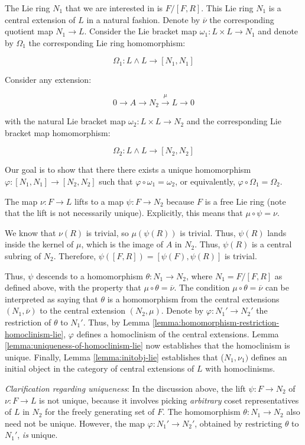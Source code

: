 The Lie ring $N_1$ that we are interested in is $F/[F,R]$. This Lie ring
$N_1$ is a central extension of $L$ in a natural fashion. Denote by
$\overline{\nu}$ the corresponding quotient map $N_1 \to L$. Consider
the Lie bracket map $\omega_1:L \times L \to N_1$ and denote by
$\Omega_1$ the corresponding Lie ring homomorphism:

$$\Omega_1: L \wedge L \to [N_1,N_1]$$

Consider any extension:

$$0 \to A \to N_2 \stackrel{\mu}{\to} L \to 0$$

with the natural Lie bracket map $\omega_2:L \times L \to N_2$ and the
corresponding Lie bracket map homomorphism:

$$\Omega_2:L \wedge L \to [N_2,N_2]$$

Our goal is to show that there there exists a unique homomorphism
$\varphi:[N_1,N_1] \to [N_2,N_2]$ such that $\varphi \circ
\omega_1 = \omega_2$, or equivalently, $\varphi \circ \Omega_1 =
\Omega_2$.

The map $\nu:F \to L$ lifts to a map $\psi:F \to N_2$ because $F$
is a free Lie ring (note that the lift is not necessarily
unique). Explicitly, this means that $\mu \circ \psi = \nu$.

We know that $\nu(R)$ is trivial, so $\mu(\psi(R))$ is trivial. Thus,
$\psi(R)$ lands inside the kernel of $\mu$, which is the image of $A$
in $N_2$. Thus, $\psi(R)$ is a central subring of $N_2$. Therefore,
$\psi([F,R]) = [\psi(F),\psi(R)]$ is trivial.

Thus, $\psi$ descends to a homomorphism $\theta:N_1 \to N_2$, where
$N_1 = F/[F,R]$ as defined above, with the property that $\mu \circ
\theta = \overline{\nu}$. The condition $\mu \circ \theta =
\overline{\nu}$ can be interpreted as saying that $\theta$ is a
homomorphism from the central extensions $(N_1,\overline{\nu})$ to the
central extension $(N_2,\mu)$. Denote by $\varphi:N_1' \to N_2'$ the
restriction of $\theta$ to $N_1'$. Thus, by Lemma
\ref{lemma:homomorphism-restriction-homoclinism-lie}, $\varphi$
defines a homoclinism of the central extensions. Lemma
\ref{lemma:uniqueness-of-homoclinism-lie} now establishes that the
homoclinism is unique. Finally, Lemma \ref{lemma:initobj-lie}
establishes that ($N_1,\nu_1)$ defines an initial object in the
category of central extensions of $L$ with homoclinisms.

{\em Clarification regarding uniqueness}: In the discussion above, the
lift $\psi: F \to N_2$ of $\nu:F \to L$ is not unique, because it
involves picking {\em arbitrary} coset representatives of $L$ in $N_2$
for the freely generating set of $F$. The homomorphism $\theta:N_1 \to
N_2$ also need not be unique. However, the map $\varphi:N_1' \to
N_2'$, obtained by restricting $\theta$ to $N_1'$, {\em is} unique.

